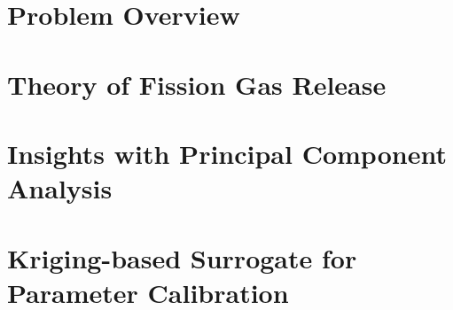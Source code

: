 \section{Problem Overview}
\label{sec:problemOverview}


\section{Theory of Fission Gas Release} 
\label{sec:fgrTheory}


\section{Insights with Principal Component Analysis}
\label{subsec:fgrPCA}


\section{Kriging-based Surrogate for Parameter Calibration}
\label{sec:fgrKriging}




